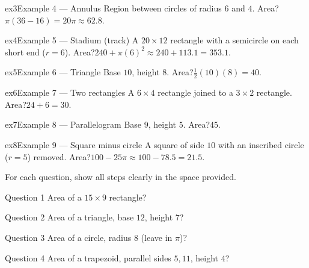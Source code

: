 \documentclass[11pt]{article}
\begin{document}
\begin{example}{ex3}{Example 4 --- Annulus}
Region between circles of radius $6$ and $4$. Area?\soln $\pi(36-16)=20\pi\approx62.8$.
\end{example}

\begin{example}{ex4}{Example 5 --- Stadium (track)}
A $20\times12$ rectangle with a semicircle on each short end ($r=6$). Area?\soln $240+\pi(6)^2\approx240+113.1=353.1$.
\end{example}

\begin{example}{ex5}{Example 6 --- Triangle}
Base $10$, height $8$. Area?\soln $\tfrac12(10)(8)=40$.
\end{example}

\begin{example}{ex6}{Example 7 --- Two rectangles}
A $6\times4$ rectangle joined to a $3\times2$ rectangle. Area?\soln $24+6=30$.
\end{example}

\begin{example}{ex7}{Example 8 --- Parallelogram}
Base $9$, height $5$. Area?\soln $45$.
\end{example}

\begin{example}{ex8}{Example 9 --- Square minus circle}
A square of side $10$ with an inscribed circle ($r=5$) removed. Area?\soln $100-25\pi\approx100-78.5=21.5$.
\end{example}

\clearpage
{}
For each question, show all steps clearly in the space provided.

\begin{qbox}{Question 1}
Area of a $15\times9$ rectangle?\workspace{2.4cm}
\end{qbox}

\begin{qbox}{Question 2}
Area of a triangle, base $12$, height $7$?\workspace{2.4cm}
\end{qbox}

\begin{qbox}{Question 3}
Area of a circle, radius $8$ (leave in $\pi$)?\workspace{2.4cm}
\end{qbox}

\begin{qbox}{Question 4}
Area of a trapezoid, parallel sides $5,11$, height $4$?\workspace{2.4cm}
\end{qbox}
\end{document}

